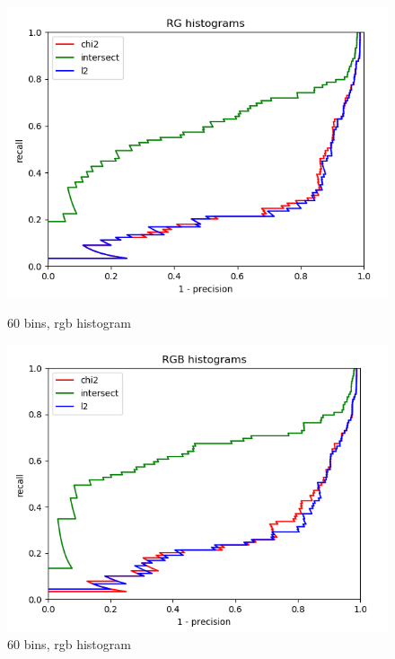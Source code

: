 \documentclass{article}
\begin{document}
\begin{figure}[ht]
    \centering
    \begin{minipage}{.5\textwidth}
        \includegraphics[width=\linewidth]{images/Q4.b-rg_histogram_60_bins.png}
        \caption{60 bins, rgb histogram}
    \end{minipage}\hfill
    \begin{minipage}{.5\textwidth}
        \includegraphics[width=\linewidth]{images/Q4.b-rgb_histogram_60_bins.png}
        \caption{60 bins, rgb histogram}
    \end{minipage}
        \begin{minipage}{.5\textwidth}

\end{minipage}
\end{figure}
\end{document}
